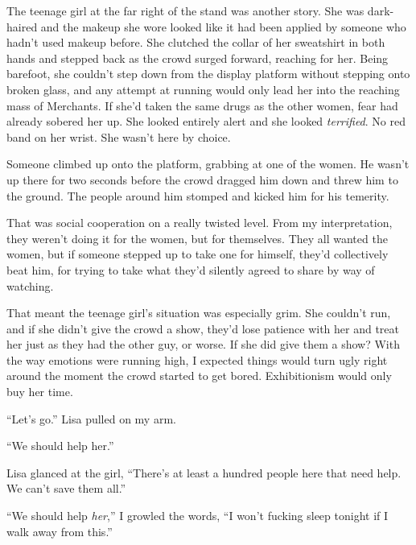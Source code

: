 The teenage girl at the far right of the stand was another story.  She was dark-haired and the makeup she wore looked like it had been applied by someone who hadn't used makeup before.  She clutched the collar of her sweatshirt in both hands and stepped back as the crowd surged forward, reaching for her.  Being barefoot, she couldn't step down from the display platform without stepping onto broken glass, and any attempt at running would only lead her into the reaching mass of Merchants.  If she'd taken the same drugs as the other women, fear had already sobered her up.  She looked entirely alert and she looked \emph{terrified}.  No red band on her wrist.  She wasn't here by choice.



Someone climbed up onto the platform, grabbing at one of the women.  He wasn't up there for two seconds before the crowd dragged him down and threw him to the ground.  The people around him stomped and kicked him for his temerity.



That was social cooperation on a really twisted level.  From my interpretation, they weren't doing it for the women, but for themselves.  They all wanted the women, but if someone stepped up to take one for himself, they'd collectively beat him, for trying to take what they'd silently agreed to share by way of watching.



That meant the teenage girl's situation was especially grim.  She couldn't run, and if she didn't give the crowd a show, they'd lose patience with her and treat her just as they had the other guy, or worse.  If she did give them a show?  With the way emotions were running high, I expected things would turn ugly right around the moment the crowd started to get bored.  Exhibitionism would only buy her time.



``Let's go.'' Lisa pulled on my arm.



``We should help her.''



Lisa glanced at the girl, ``There's at least a hundred people here that need help.  We can't save them all.''



``We should help \emph{her},'' I growled the words, ``I won't fucking sleep tonight if I walk away from this.''



